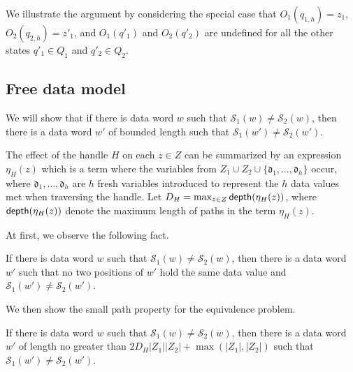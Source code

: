 \documentclass[runningheads,a4paper]{llncs}
\newcommand{\hide}[1]{}
\newcommand\dom{\mathsf{dom}}
\newcommand\nat{\mathbb{N}}
\newcommand\Ss{\mathcal{S}}
\newcommand\vard{\mathfrak{d}}
\begin{document}
We illustrate the argument by considering the special case that $O_1(q_{1,h})=z_1$, $O_2(q_{2,h})=z'_1$, and $O_1(q'_1)$ and $O_2(q'_2)$ are undefined  for all the other states $q'_1  \in Q_1$ and $q'_2 \in Q_2$.

 
\subsection{Free data model}

\hide{
For $i=1,2$, define 
$$I_{\Ss_i} = \{j \mid 1 \le j \le h, q_{i,j} \in \dom(O) \} \cup \{h + n p + j \mid n \in \nat, 0 \le j < p, q_{i, h+j} \in \dom(O)\}.$$

\smallskip

\noindent {\bf Step I}: If $I_{\Ss_1} \neq I_{\Ss_2}$, then return false. Otherwise, go to Step II.

\smallskip
}


We will show that if there is data word $w$ such that $\Ss_1(w) \neq \Ss_2(w)$, then there is a data word $w'$ of bounded length such that $\Ss_1(w') \neq \Ss_2(w')$.

The effect of the handle $H$ on each $z \in Z$ can be summarized by an expression $\eta_H(z)$ which is a term where the variables from $Z_1 \cup Z_2 \cup \{\vard_1,\dots, \vard_h\}$ occur, where $\vard_1,\dots, \vard_h$ are $h$ fresh variables introduced to represent the $h$ data values met when traversing the handle.  Let $D_H = \max_{z \in Z} {\sf depth}(\eta_H(z))$, where ${\sf depth}(\eta_H(z))$ denote the  maximum length of paths in the term $\eta_H(z)$.

At first, we observe the following fact.

\begin{proposition}\label{prop-distinct}
If there is data word $w$ such that $\Ss_1(w) \neq \Ss_2(w)$, then there is a data word $w'$ such that  no two positions of $w'$ hold the same data value and $\Ss_1(w') \neq \Ss_2(w')$.
\end{proposition}

\newcommand\node{{\sf Node}}

\newcommand\dif{{\sf DIF}}

\newcommand\var{{\sf var}}

We then show the small path property for the equivalence problem.

\begin{proposition}\label{prop-free-bnd}
If there is data word $w$ such that $\Ss_1(w) \neq \Ss_2(w)$, then there is a data word $w'$ of length no greater than $2D_H |Z_1|  |Z_2| + \max(|Z_1|, |Z_2|)$  such that $\Ss_1(w') \neq \Ss_2(w')$.
\end{proposition}
\end{document}
